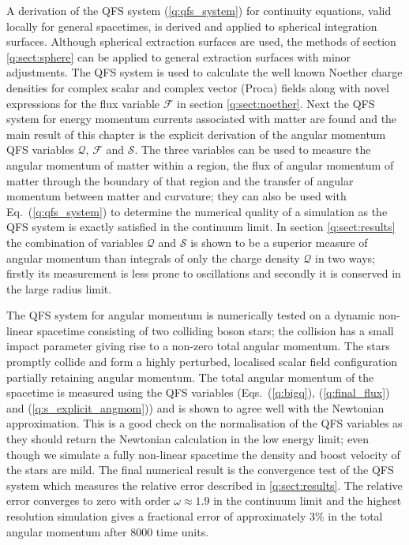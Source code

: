 A derivation of the QFS system (\ref{q:qfs_system}) for continuity equations, valid locally for general spacetimes, is derived and applied to spherical integration surfaces. Although spherical extraction surfaces are used, the methods of section \ref{q:sect:sphere} can be applied to general extraction surfaces with minor adjustments. The QFS system is used to calculate the well known Noether charge densities for complex scalar and complex vector (Proca) fields along with novel expressions for the flux variable $\mathcal{F}$ in section \ref{q:sect:noether}. Next the QFS system for energy momentum currents associated with matter are found and the main result of this chapter is the explicit derivation of the angular momentum QFS variables $\mathcal{Q}$,  $\mathcal{F}$ and $\mathcal{S}$. The three variables can be used to measure the angular momentum of matter within a region, the flux of angular momentum of matter through the boundary of that region and the transfer of angular momentum between matter and curvature; they can also be used with Eq.~(\ref{q:qfs_system}) to determine the numerical quality of a simulation as the QFS system is exactly satisfied in the continuum limit. In section \ref{q:sect:results} the combination of variables $\mathcal{Q}$ and $\mathcal{S}$ is shown to be a superior measure of angular momentum than integrals of only the charge density $\mathcal{Q}$ in two ways; firstly its measurement is less prone to oscillations and secondly it is conserved in the large radius limit.

The QFS system for angular momentum is numerically tested on a dynamic non-linear spacetime consisting of two colliding boson stars; the collision has a small impact parameter giving rise to a non-zero total angular momentum. The stars promptly collide and form a highly perturbed, localised scalar field configuration partially retaining angular momentum. The total angular momentum of the spacetime is measured using the QFS variables (Eqs.~(\ref{q:bigq}), (\ref{q:final_flux}) and (\ref{q:s_explicit_angmom})) and is shown to agree well with the Newtonian approximation. This is a good check on the normalisation of the QFS variables as they should return the Newtonian calculation in the low energy limit; even though we simulate a fully non-linear spacetime the density and boost velocity of the stars are mild. The final numerical result is the convergence test of the QFS system which measures the relative error described in \ref{q:sect:results}. The relative error converges to zero with order $\omega\approx 1.9$ in the continuum limit and the highest resolution simulation gives a fractional error of approximately $3 \%$ in the total angular momentum after $8000$ time units. 

